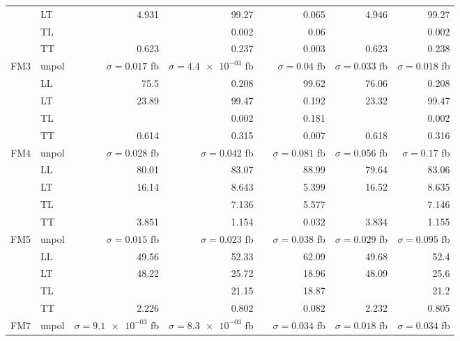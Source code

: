 \begin{table}[h]
{\begin{tabular}{llrrrrrr}
 & LT & \num{4.931} & \num{99.27} &  & \num{0.065} & \num{4.946} & \num{99.27} \\
 & TL &  & \num{0.002} &  & \num{0.06} &  & \num{0.002} \\
 & TT & \num{0.623} & \num{0.237} &  & \num{0.003} & \num{0.623} & \num{0.238} \\
\midrule
\multirow{5}{*}{FM3}
 & unpol & $\sigma = \num{0.017}$ fb & $\sigma = \num{4.4e-03}$ fb &  & $\sigma = \num{0.04}$ fb & $\sigma = \num{0.033}$ fb & $\sigma = \num{0.018}$ fb \\
 & LL & \num{75.5} & \num{0.208} &  & \num{99.62} & \num{76.06} & \num{0.208} \\
 & LT & \num{23.89} & \num{99.47} &  & \num{0.192} & \num{23.32} & \num{99.47} \\
 & TL &  & \num{0.002} &  & \num{0.181} &  & \num{0.002} \\
 & TT & \num{0.614} & \num{0.315} &  & \num{0.007} & \num{0.618} & \num{0.316} \\
\midrule
\multirow{5}{*}{FM4}
 & unpol & $\sigma = \num{0.028}$ fb & $\sigma = \num{0.042}$ fb &  & $\sigma = \num{0.081}$ fb & $\sigma = \num{0.056}$ fb & $\sigma = \num{0.17}$ fb \\
 & LL & \num{80.01} & \num{83.07} &  & \num{88.99} & \num{79.64} & \num{83.06} \\
 & LT & \num{16.14} & \num{8.643} &  & \num{5.399} & \num{16.52} & \num{8.635} \\
 & TL &  & \num{7.136} &  & \num{5.577} &  & \num{7.146} \\
 & TT & \num{3.851} & \num{1.154} &  & \num{0.032} & \num{3.834} & \num{1.155} \\
\midrule
\multirow{5}{*}{FM5}
 & unpol & $\sigma = \num{0.015}$ fb & $\sigma = \num{0.023}$ fb &  & $\sigma = \num{0.038}$ fb & $\sigma = \num{0.029}$ fb & $\sigma = \num{0.095}$ fb \\
 & LL & \num{49.56} & \num{52.33} &  & \num{62.09} & \num{49.68} & \num{52.4} \\
 & LT & \num{48.22} & \num{25.72} &  & \num{18.96} & \num{48.09} & \num{25.6} \\
 & TL &  & \num{21.15} &  & \num{18.87} &  & \num{21.2} \\
 & TT & \num{2.226} & \num{0.802} &  & \num{0.082} & \num{2.232} & \num{0.805} \\
\midrule
\multirow{5}{*}{FM7}
 & unpol & $\sigma = \num{9.1e-03}$ fb & $\sigma = \num{8.3e-03}$ fb &  & $\sigma = \num{0.034}$ fb & $\sigma = \num{0.018}$ fb & $\sigma = \num{0.034}$ fb \\

\end{tabular}}
\end{table}
